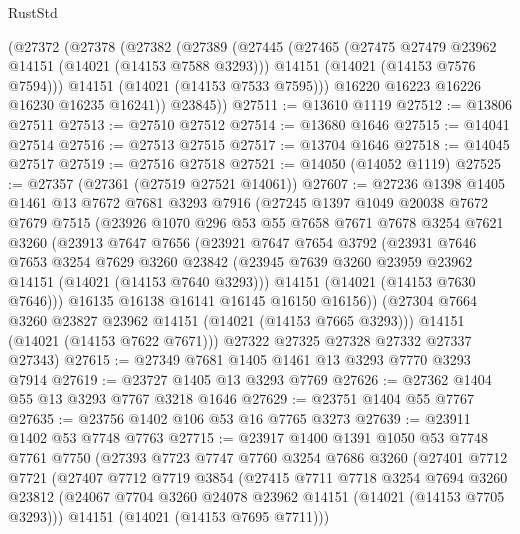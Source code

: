 \begin{lexlean}{RustStd}
\begin{coremodule}
    (@27372
      (@27378
        (@27382
          (@27389
            (@27445
              (@27465
                (@27475 @27479 @23962 @14151 (@14021 (@14153 @7588 @3293)))
                @14151
                (@14021 (@14153 @7576 @7594)))
              @14151
              (@14021 (@14153 @7533 @7595)))
            @16220
            @16223
            @16226
            @16230
            @16235
            @16241))
        @23845))
@27511 := @13610 @1119
@27512 := @13806 @27511
@27513 := @27510 @27512
@27514 := @13680 @1646
@27515 := @14041 @27514
@27516 := @27513 @27515
@27517 := @13704 @1646
@27518 := @14045 @27517
@27519 := @27516 @27518
@27521 := @14050 (@14052 @1119)
@27525 := @27357 (@27361 (@27519 @27521 @14061))
@27607 := @27236
    @1398
    @1405
    @1461
    @13
    @7672
    @7681
    @3293
    @7916
    (@27245
      @1397
      @1049
      @20038
      @7672
      @7679
      @7515
      (@23926
        @1070
        @296
        @53
        @55
        @7658
        @7671
        @7678
        @3254
        @7621
        @3260
        (@23913
          @7647
          @7656
          (@23921
            @7647
            @7654
            @3792
            (@23931
              @7646
              @7653
              @3254
              @7629
              @3260
              @23842
              (@23945 @7639 @3260 @23959 @23962 @14151 (@14021 (@14153 @7640 @3293)))
              @14151
              (@14021 (@14153 @7630 @7646)))
            @16135
            @16138
            @16141
            @16145
            @16150
            @16156))
        (@27304 @7664 @3260 @23827 @23962 @14151 (@14021 (@14153 @7665 @3293)))
        @14151
        (@14021 (@14153 @7622 @7671)))
      @27322
      @27325
      @27328
      @27332
      @27337
      @27343)
@27615 := @27349 @7681 @1405 @1461 @13 @3293 @7770 @3293 @7914
@27619 := @23727 @1405 @13 @3293 @7769
@27626 := @27362 @1404 @55 @13 @3293 @7767 @3218 @1646
@27629 := @23751 @1404 @55 @7767
@27635 := @23756 @1402 @106 @53 @16 @7765 @3273
@27639 := @23911 @1402 @53 @7748 @7763
@27715 := @23917
    @1400
    @1391
    @1050
    @53
    @7748
    @7761
    @7750
    (@27393
      @7723
      @7747
      @7760
      @3254
      @7686
      @3260
      (@27401
        @7712
        @7721
        (@27407
          @7712
          @7719
          @3854
          (@27415
            @7711
            @7718
            @3254
            @7694
            @3260
            @23812
            (@24067 @7704 @3260 @24078 @23962 @14151 (@14021 (@14153 @7705 @3293)))
            @14151
            (@14021 (@14153 @7695 @7711)))

\end{coremodule}
\end{lexlean}
